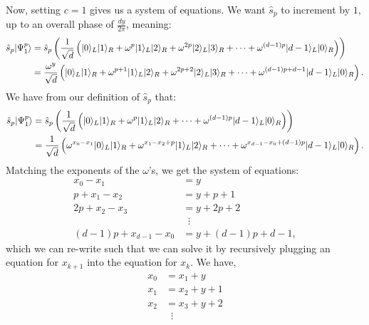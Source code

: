 \begin{enumerate}
  Now, setting $c=1$ gives us a system of equations. We want $\hat{s}_p$ to increment by $1$, up to an overall phase of $\frac{dy}{2 \pi}$, meaning:
\begin{equation}
  \begin{split}
        \hat{s}_p | \Psi_1^p \rangle &= \hat{s}_p  \left( \frac{1}{\sqrt{d}}\left(| 0 \rangle_L| 1 \rangle_R + \omega^{p} | 1 \rangle_L| 2 \rangle_R + \omega^{2 p} | 2 \rangle_L| 3 \rangle_R + \cdots + \omega^{(d-1)p} | d-1 \rangle_L| 0 \rangle_R\right) \right) \\
                             &= \frac{\omega^{y}}{\sqrt{d}}\left(| 0 \rangle_L| 1 \rangle_R + \omega^{p+1} | 1 \rangle_L| 2 \rangle_R + \omega^{2 p + 2} | 2 \rangle_L| 3 \rangle_R +  \cdots + \omega^{(d-1)p + d - 1} | d-1 \rangle_L| 0 \rangle_R\right).
  \end{split}
\end{equation}
We have from our definition of $\hat{s}_p$ that:
\begin{equation}
  \begin{split}
        \hat{s}_p | \Psi_1^p \rangle &= \hat{s}_p  \left( \frac{1}{\sqrt{d}}\left(| 0 \rangle_L| 1 \rangle_R + \omega^{p} | 1 \rangle_L| 2 \rangle_R + \cdots + \omega^{(d-1)p} | d-1 \rangle_L| 0 \rangle_R\right) \right) \\
                             &= \frac{1}{\sqrt{d}}\left(\omega^{x_0 - x_1}| 0 \rangle_L| 1 \rangle_R + \omega^{x_1 - x_2 + p}  | 1 \rangle_L| 2 \rangle_R + \cdots + \omega^{x_{d-1} - x_0 + (d-1)p} | d-1 \rangle_L| 0 \rangle_R\right).
  \end{split}
\end{equation}
Matching the exponents of the $\omega$'s, we get the system of equations:
\begin{equation}
  \begin{split}
      x_0 - x_1 &= y \\
  p + x_1 - x_2 &= y + p + 1\\
  2p + x_2 - x_3 &= y + 2p + 2\\
  &\; \; \vdots \\
  (d-1)p + x_{d-1} - x_0 &= y + (d-1)p + d-1,
  \end{split}
\end{equation}
which we can re-write such that we can solve it by recursively plugging an equation for $x_{k+1}$ into the equation for $x_k$. We have,
\begin{equation} \label{sys1}
  \begin{split}
      x_0 &= x_1 + y \\
  x_1 &= x_2 + y + 1\\
  x_2 &= x_3 + y + 2\\
  &\; \; \vdots \\

\end{split}
\end{equation}
\end{enumerate}
